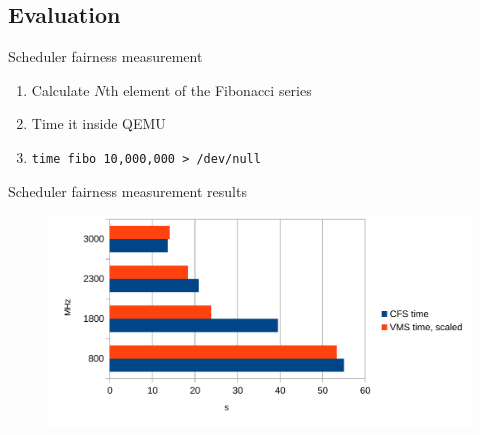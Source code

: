 \subsection{Evaluation}

\begin{frame}{Scheduler fairness measurement}
    \begin{enumerate}
        \item Calculate $N$th element of the Fibonacci series
        \item Time it inside QEMU
        \item \texttt{time fibo 10,000,000 > /dev/null}
    \end{enumerate}
\end{frame}

\begin{frame}{Scheduler fairness measurement results}
    \begin{figure}
       \includegraphics[width=1\linewidth]{img/fibo.pdf}
    \end{figure}
\end{frame}
